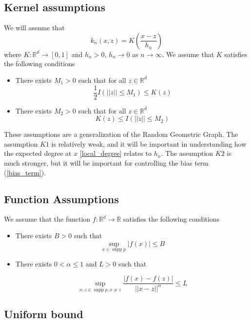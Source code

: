 \documentclass{article}
\DeclareMathOperator\supp{supp}
\begin{document}
\subsection{Kernel assumptions} We will assume that
\begin{equation}
\label{kernel_def}
k_n(x,z)=K(\frac{x-z}{h_n})    
\end{equation}
where $K\colon\mathbb{R}^d\to [0,1]$ and $h_n>0$, $h_n\to 0$ as $n\to\infty$. We assume that $K$ satisfies the following conditions 
\begin{itemize}
    \item There exists $M_1>0$ such that for all
    $z\in\mathbb{R}^d$ 
    \begin{equation*}
        \frac{1}{2}I(||z||\leq M_1)\leq K(z)
    \end{equation*}
    \item There exists $M_2>0$ such that for all
    $z\in\mathbb{R}^d$
    \begin{equation*}
        K(z)\leq I(||z||\leq M_2)
    \end{equation*}
\end{itemize}
These assumptions are a generalization of the Random Geometric Graph. The assumption $K1$ is relatively weak, and it will be important in understanding how the expected degree at $x$ \ref{local_degree} relates to $h_n$. The assumption $K2$ is much stronger, but it will be important for controlling the bias term (\ref{bias_term}).

\subsection{Function Assumptions} We assume that the function $f\colon\mathbb{R}^d\to\mathbb{R}$ satisfies the following conditions
\begin{itemize}
    \item There exists $B>0$ such that 
    \begin{equation*}
        \sup_{x\in\supp{p}} |f(x)| \leq B
    \end{equation*}
    \item There exists $0<\alpha\leq 1$ and $L>0$ such that
    
    \begin{equation*}
        \sup_{x,z\in\supp{p},x\neq z} \frac{|f(x)-f(z)|}{||x-z||^{\alpha}}\leq L
    \end{equation*}
\end{itemize}

\subsection{Uniform bound}
\end{document}
